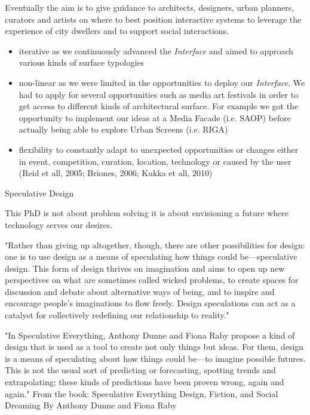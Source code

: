 
Eventually the aim is to give guidance to architects, designers, urban planners, curators and artists on where to best position interactive systems to leverage the experience of city dwellers and to support social interactions.  


\begin{itemize}
\item iterative as we continuously advanced the \textit{Interface} and aimed to approach various kinds of surface typologies
\item non-linear as we were limited in the opportunities to deploy our \textit{Interface}. We had to apply for several opportunities such as media art festivals in order to get access to different kinds of architectural surface. For example we got the opportunity to implement our ideas at a Media Facade (i.e. SAOP) before actually being able to explore Urban Screens (i.e. RIGA) 
\item flexibility to constantly adapt to unexpected opportunities or changes either in event, competition, curation, location, technology or caused by the user (Reid et all, 2005; Briones, 2006; Kukka et all, 2010)
\end{itemize}


Speculative Design

This PhD is not about problem solving it is about envisioning a future where technology serves our desires.

"Rather than giving up altogether, though, there are other possibilities
for design: one is to use design as a means of speculating how things could
be—speculative design. This form of design thrives on imagination and aims to
open up new perspectives on what are sometimes called wicked problems, to
create spaces for discussion and debate about alternative ways of being, and
to inspire and encourage people’s imaginations to flow freely. Design
speculations can act as a catalyst for collectively redefining our relationship
to reality."

"In Speculative Everything, Anthony Dunne and Fiona Raby propose a kind of design that is used as a tool to create not only things but ideas. For them, design is a means of speculating about how things could be—to imagine possible futures. This is not the usual sort of predicting or forecasting, spotting trends and extrapolating; these kinds of predictions have been proven wrong, again and again." From the book: Speculative Everything Design, Fiction, and Social Dreaming By Anthony Dunne and Fiona Raby

